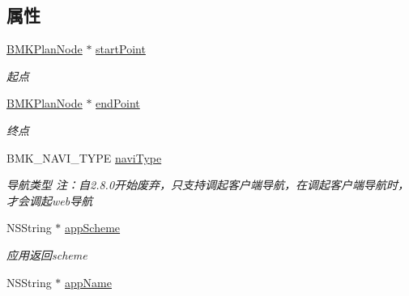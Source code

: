 \subsection*{属性}
\begin{DoxyCompactItemize}
\item 
\hypertarget{interface_b_m_k_navi_para_aafbed621fc51d1fe9a24b007f06635fb}{}\hyperlink{interface_b_m_k_plan_node}{B\+M\+K\+Plan\+Node} $\ast$ \hyperlink{interface_b_m_k_navi_para_aafbed621fc51d1fe9a24b007f06635fb}{start\+Point}\label{interface_b_m_k_navi_para_aafbed621fc51d1fe9a24b007f06635fb}

\begin{DoxyCompactList}\small\item\em 起点 \end{DoxyCompactList}\item 
\hypertarget{interface_b_m_k_navi_para_a6c47b9b500a1361c81843dde65b79928}{}\hyperlink{interface_b_m_k_plan_node}{B\+M\+K\+Plan\+Node} $\ast$ \hyperlink{interface_b_m_k_navi_para_a6c47b9b500a1361c81843dde65b79928}{end\+Point}\label{interface_b_m_k_navi_para_a6c47b9b500a1361c81843dde65b79928}

\begin{DoxyCompactList}\small\item\em 终点 \end{DoxyCompactList}\item 
\hypertarget{interface_b_m_k_navi_para_abbc3ff6ed83b98d211205ebf2153fe2b}{}B\+M\+K\+\_\+\+N\+A\+V\+I\+\_\+\+T\+Y\+P\+E \hyperlink{interface_b_m_k_navi_para_abbc3ff6ed83b98d211205ebf2153fe2b}{navi\+Type}\label{interface_b_m_k_navi_para_abbc3ff6ed83b98d211205ebf2153fe2b}

\begin{DoxyCompactList}\small\item\em 导航类型 注：自2.8.\+0开始废弃，只支持调起客户端导航，在调起客户端导航时，才会调起web导航 \end{DoxyCompactList}\item 
\hypertarget{interface_b_m_k_navi_para_aa6d336d0e092b0624c49cacf73141bee}{}N\+S\+String $\ast$ \hyperlink{interface_b_m_k_navi_para_aa6d336d0e092b0624c49cacf73141bee}{app\+Scheme}\label{interface_b_m_k_navi_para_aa6d336d0e092b0624c49cacf73141bee}

\begin{DoxyCompactList}\small\item\em 应用返回scheme \end{DoxyCompactList}\item 
\hypertarget{interface_b_m_k_navi_para_a4c98f8aca9d18fd287e345aaffff4f1c}{}N\+S\+String $\ast$ \hyperlink{interface_b_m_k_navi_para_a4c98f8aca9d18fd287e345aaffff4f1c}{app\+Name}\label{interface_b_m_k_navi_para_a4c98f8aca9d18fd287e345aaffff4f1c}


\end{DoxyCompactItemize}
